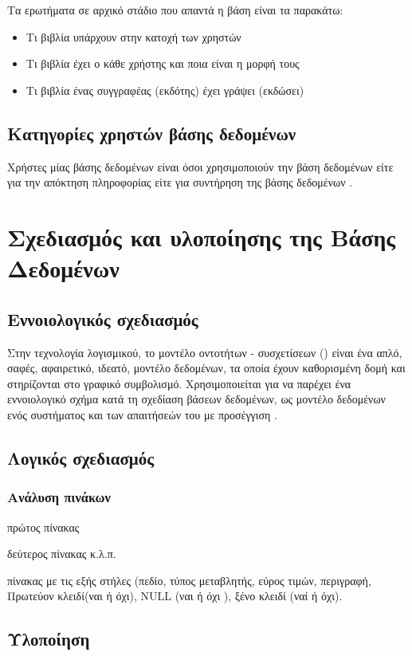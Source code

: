\documentclass{assignment}
\begin{document}
Τα ερωτήματα σε αρχικό στάδιο που απαντά η βάση είναι τα παρακάτω:

\begin{itemize}
  \item Τι βιβλία υπάρχουν στην κατοχή των χρηστών
  \item Τι βιβλία έχει ο κάθε χρήστης και ποια είναι η μορφή τους
  \item Τι βιβλία ένας συγγραφέας (εκδότης) έχει γράψει (εκδώσει)
\end{itemize}



\subsection{Κατηγορίες χρηστών βάσης δεδομένων}

Χρήστες μίας βάσης δεδομένων είναι όσοι χρησιμοποιούν την βάση δεδομένων είτε για την απόκτηση πληροφορίας είτε για συντήρηση της βάσης δεδομένων \cite{baseis_eap}.

\section{Σχεδιασμός και υλοποίησης της Βάσης Δεδομένων}

\subsection{Εννοιολογικός σχεδιασμός}

Στην τεχνολογία λογισμικού, το μοντέλο οντοτήτων - συσχετίσεων () είναι ένα απλό, σαφές, αφαιρετικό, ιδεατό, μοντέλο δεδομένων, τα οποία έχουν καθορισμένη δομή και στηρίζονται στο γραφικό συμβολισμό. Χρησιμοποιείται για να παρέχει ένα εννοιολογικό σχήμα κατά τη σχεδίαση βάσεων δεδομένων, ως μοντέλο δεδομένων ενός συστήματος και των απαιτήσεών του με  προσέγγιση \cite{wiki:Entity_relationship_model, class_notes}.

\subsection{Λογικός σχεδιασμός}

\subsubsection{Ανάλυση πινάκων}

πρώτος πίνακας

δεύτερος πίνακας κ.λ.π.

πίνακας με τις εξής στήλες (πεδίο, τύπος μεταβλητής, εύρος τιμών, περιγραφή, Πρωτεύον κλειδί(ναι ή όχι), NULL (ναι ή όχι ), ξένο κλειδί (ναί ή όχι).

\subsection{Υλοποίηση}

 \label{Βιβλιογραφία}



\newpage
\end{document}
